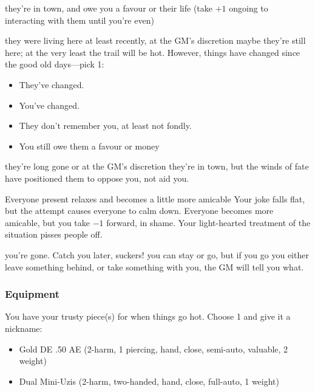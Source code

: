 {they're in town, and owe you a favour or their life (take $+1$ ongoing to interacting with them until you're even)}
{they were living here at least recently, at the GM's discretion maybe they're still here; at the very least the trail will be hot. However, things have changed since the good old days---pick 1:
\begin{itemize}
\item They've changed.
\item You've changed.
\item They don't remember you, at least not fondly.
\item You still owe them a favour or money
\end{itemize}}
{they're long gone or at the GM's discretion they're in town, but the winds of fate have positioned them to oppose you, not aid you.}

{Everyone present relaxes and becomes a little more amicable}
{Your joke falls flat, but the attempt causes everyone to calm down. Everyone becomes more amicable, but you take $-1$ forward, in shame.}
{Your light-hearted treatment of the situation pisses people off.}

{you're gone. Catch you later, suckers!}
{you can stay or go, but if you go you either leave something behind, or take something with you, the GM will tell you what.}

\subsubsection{Equipment}
You have your trusty piece(s) for when things go hot. Choose 1 and give it a nickname:
\begin{itemize}
\item Gold DE .50 AE (2-harm, 1 piercing, hand, close, semi-auto, valuable, 2 weight)
\item Dual Mini-Uzis (2-harm, two-handed, hand, close, full-auto, 1 weight) 
\end{itemize}

